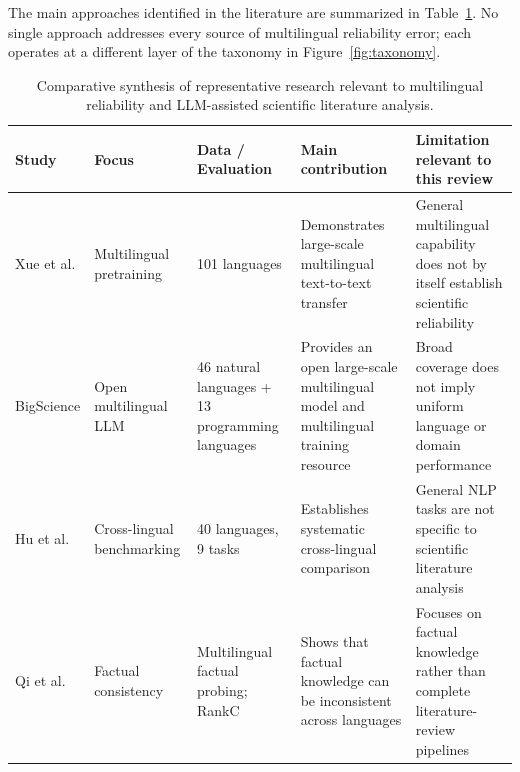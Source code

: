 \documentclass[acmsmall,screen,review]{acmart}
\begin{document}
The main approaches identified in the literature are summarized in Table~\ref{tab:comparative}. No single approach addresses every source of multilingual reliability error; each operates at a different layer of the taxonomy in Figure~\ref{fig:taxonomy}.


\begin{table}[t]

\caption{
Comparative synthesis of representative research relevant to multilingual reliability and LLM-assisted scientific literature analysis.
}

\label{tab:comparative}

\centering
\small

\begin{tabularx}{\textwidth}
{@{}p{}
 p{}
 p{}
 X
 p{}@{}}

\toprule

\textbf{Study}
&
\textbf{Focus}
&
\textbf{Data / Evaluation}
&
\textbf{Main contribution}
&
\textbf{Limitation relevant to this review}
\\

\midrule

Xue et al. \citep{xue2021mt5}
&
Multilingual pretraining
&
101 languages
&
Demonstrates large-scale multilingual text-to-text transfer
&
General multilingual capability does not by itself establish scientific reliability
\\

BigScience \citep{bigscience2022bloom}
&
Open multilingual LLM
&
46 natural languages + 13 programming languages
&
Provides an open large-scale multilingual model and multilingual training resource
&
Broad coverage does not imply uniform language or domain performance
\\

Hu et al. \citep{hu2020xtreme}
&
Cross-lingual benchmarking
&
40 languages, 9 tasks
&
Establishes systematic cross-lingual comparison
&
General NLP tasks are not specific to scientific literature analysis
\\

Qi et al. \citep{qi2023crosslingual}
&
Factual consistency
&
Multilingual factual probing; RankC
&
Shows that factual knowledge can be inconsistent across languages
&
Focuses on factual knowledge rather than complete literature-review pipelines
\\


\end{tabularx}
\end{table}
\end{document}
